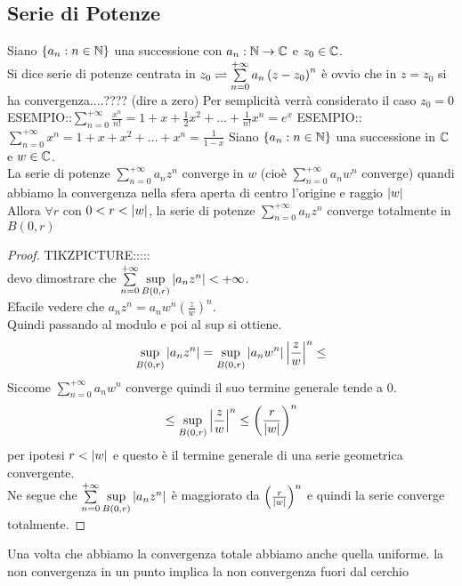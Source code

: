 \subsection{Serie di Potenze}
Siano $\left\{a_n:n\in\mathbb{N}\right\}$ una successione con $a_n:\mathbb{N}\to\mathbb{C}$ e $z_0\in\mathbb{C}$.\\
Si dice serie di potenze centrata in $z_0 \rightleftharpoons \sum\limits_{n=0}^{+\infty}a_n\left(z-z_0\right)^n$
\observation
è ovvio che in $z=z_0$ si ha convergenza....???? (dire a zero)
\observation
Per semplicità verrà considerato il caso $z_0=0$
ESEMPIO::$\sum\limits_{n=0}^{+\infty}\frac{x^n}{n!}=1+x+\frac{1}{2} x^2+\ldots+\frac{1}{n!}x^n=e^x$
ESEMPIO::$\sum\limits_{n=0}^{+\infty}x^n=1+x+x^2+\ldots+x^n=\frac{1}{1-x}$
\proposition
Siano $\left\{a_n:n\in\mathbb{N}\right\}$ una successione in $\mathbb{C}$ e $w\in\mathbb{C}$.\\
La serie di potenze $\sum\limits_{n=0}^{+\infty}a_nz^n$ converge in $w$ (cioè $\sum\limits_{n=0}^{+\infty}a_nw^n$ converge) quandi abbiamo la convergenza nella sfera aperta di centro l'origine e raggio $\left|w\right|$\\
Allora $\forall r$ con $0<r<\left|w\right|$, la serie di potenze $\sum\limits_{n=0}^{+\infty}a_nz^n$ converge totalmente in $B(0,r)$\\
\begin{proof}
	TIKZPICTURE:::::\\
	devo dimostrare che $\sum\limits_{n=0}^{+\infty}\sup\limits_{B(0,r)}\left|a_nz^n\right|<+\infty$.\\
	E\' facile vedere che $a_nz^n=a_nw^n\left(\frac{z}{w}\right)^n$.\\
	Quindi passando al modulo e poi al sup si ottiene.\\
	\[\sup\limits_{B(0,r)}\left|a_nz^n\right|=\sup\limits_{B(0,r)}\left|a_nw^n\right|\left|\frac{z}{w}\right|^n\le\]
	Siccome $\sum\limits_{n=0}^{+\infty}a_nw^n$ converge  quindi il suo termine generale tende a $0$.\\
	\[\le\sup\limits_{B(0,r)}\left|\frac{z}{w}\right|^n\le\left(\frac{r}{\left|w\right|}\right)^n \]
	per ipotesi $r<\left|w\right|$ e questo è il termine generale di una serie geometrica convergente.\\
	Ne segue che $\sum\limits_{n=0}^{+\infty}\sup\limits_{B(0,r)}\left|a_nz^n\right|$ è maggiorato da $\left( \frac{r}{\left|w\right|}\right)^n$ e quindi la serie converge totalmente.
\end{proof}
\observation
Una volta che abbiamo la convergenza totale abbiamo anche quella uniforme.
\proposition la non convergenza in un punto implica la non convergenza fuori dal cerchio\\
